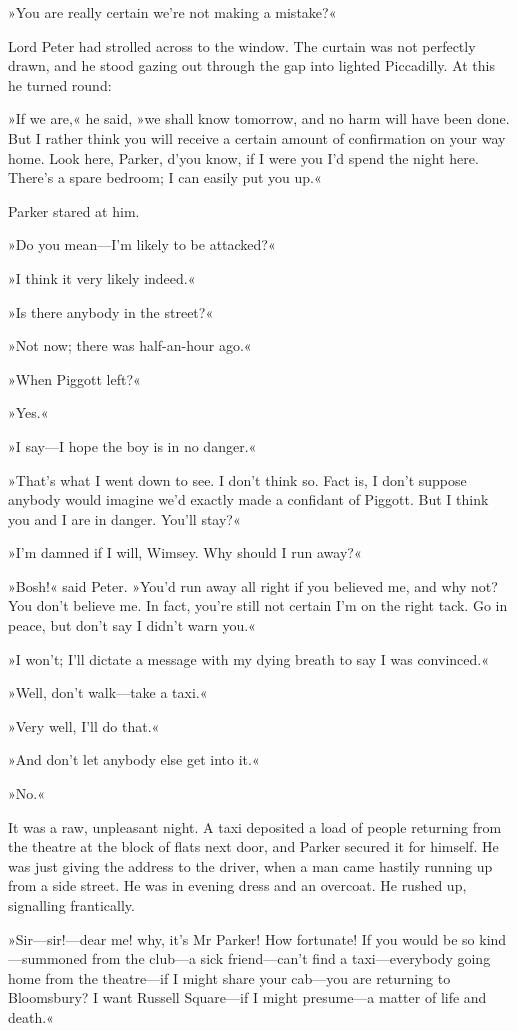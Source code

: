 »You are really certain we're not making a mistake?«

Lord Peter had strolled across to the window. The curtain was not perfectly drawn, and he stood gazing out through the gap into lighted Piccadilly. At this he turned round:

»If we are,« he said, »we shall know tomorrow, and no harm will have been done. But I rather think you will receive a certain amount of confirmation on your way home. Look here, Parker, d'you know, if I were you I'd spend the night here. There's a spare bedroom; I can easily put you up.«

Parker stared at him.

»Do you mean—I'm likely to be attacked?«

»I think it very likely indeed.«

»Is there anybody in the street?«

»Not now; there was half-an-hour ago.«

»When Piggott left?«

»Yes.«

»I say—I hope the boy is in no danger.«

»That's what I went down to see. I don't think so. Fact is, I don't suppose anybody would imagine we'd exactly made a confidant of Piggott. But I think you and I are in danger. You'll stay?«

»I'm damned if I will, Wimsey. Why should I run away?«

»Bosh!« said Peter. »You'd run away all right if you believed me, and why not? You don't believe me. In fact, you're still not certain I'm on the right tack. Go in peace, but don't say I didn't warn you.«

»I won't; I'll dictate a message with my dying breath to say I was convinced.«

»Well, don't walk—take a taxi.«

»Very well, I'll do that.«

»And don't let anybody else get into it.«

»No.«

It was a raw, unpleasant night. A taxi deposited a load of people returning from the theatre at the block of flats next door, and Parker secured it for himself. He was just giving the address to the driver, when a man came hastily running up from a side street. He was in evening dress and an overcoat. He rushed up, signalling frantically.

»Sir—sir!---dear me! why, it's Mr Parker! How fortunate! If you would be so kind—summoned from the club—a sick friend—can't find a taxi—everybody going home from the theatre—if I might share your cab—you are returning to Bloomsbury? I want Russell Square—if I might presume—a matter of life and death.«

